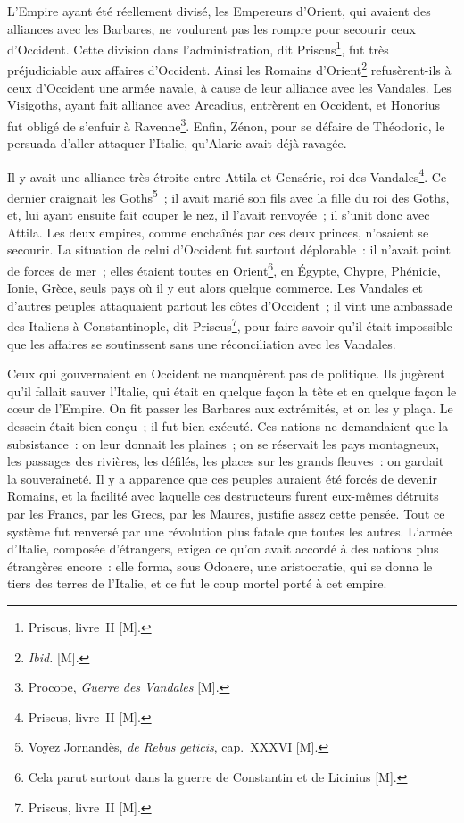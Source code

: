 \documentclass[french,twoside]{book} %
\begin{document}
L’Empire ayant été réellement divisé, les Empereurs d’Orient, qui avaient des alliances avec les Barbares, ne voulurent pas les rompre pour secourir ceux d’Occident. Cette division dans l’administration, dit Priscus\footnote{Priscus, livre II [M].}, fut très préjudiciable aux affaires d’Occident. Ainsi les Romains d’Orient\footnote{{\itshape Ibid.} [M].} refusèrent-ils à ceux d’Occident une armée navale, à cause de leur alliance avec les Vandales. Les Visigoths, ayant fait alliance avec Arcadius, entrèrent en Occident, et Honorius fut obligé de s’enfuir à Ravenne\footnote{Procope, {\itshape Guerre des Vandales} [M].}. Enfin, Zénon, pour se défaire de Théodoric, le persuada d’aller attaquer l’Italie, qu’Alaric avait déjà ravagée.\par
Il y avait une alliance très étroite entre Attila et Genséric, roi des Vandales\footnote{Priscus, livre II [M].}. Ce dernier craignait les Goths\footnote{Voyez Jornandès, {\itshape de Rebus geticis}, cap. XXXVI [M].} ; il avait marié son fils avec la fille du roi des Goths, et, lui ayant ensuite fait couper le nez, il l’avait renvoyée ; il s’unit donc avec Attila. Les deux empires, comme enchaînés par ces deux princes, n’osaient se secourir. La situation de celui d’Occident fut surtout déplorable : il n’avait point de forces de mer ; elles étaient toutes en Orient\footnote{Cela parut surtout dans la guerre de Constantin et de Licinius [M].}, en Égypte, Chypre, Phénicie, Ionie, Grèce, seuls pays où il y eut alors quelque commerce. Les Vandales et d’autres peuples attaquaient partout les côtes d’Occident ; il vint une ambassade des Italiens à Constantinople, dit Priscus\footnote{Priscus, livre II [M].}, pour faire savoir qu’il était impossible que les affaires se soutinssent sans une réconciliation avec les Vandales.\par
Ceux qui gouvernaient en Occident ne manquèrent pas de politique. Ils jugèrent qu’il fallait sauver l’Italie, qui était en quelque façon la tête et en quelque façon le cœur de l’Empire. On fit passer les Barbares aux extrémités, et on les y plaça. Le dessein était bien conçu ; il fut bien exécuté. Ces nations ne demandaient que la subsistance : on leur donnait les plaines ; on se réservait les pays montagneux, les passages des rivières, les défilés, les places sur les grands fleuves : on gardait la souveraineté. Il y a apparence que ces peuples auraient été forcés de devenir Romains, et la facilité avec laquelle ces destructeurs furent eux-mêmes détruits par les Francs, par les Grecs, par les Maures, justifie assez cette pensée. Tout ce système fut renversé par une révolution plus fatale que toutes les autres. L’armée d’Italie, composée d’étrangers, exigea ce qu’on avait accordé à des nations plus étrangères encore : elle forma, sous Odoacre, une aristocratie, qui se donna le tiers des terres de l’Italie, et ce fut le coup mortel porté à cet empire.\par
\end{document}
